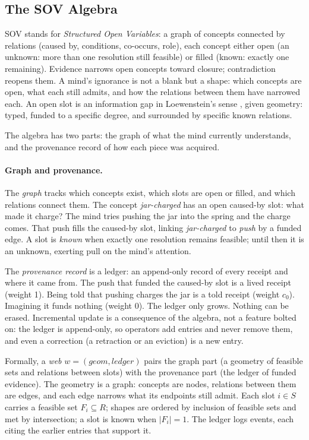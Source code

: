 \documentclass[11pt]{article}
\newcommand{\sov}{\textsc{SOV}}
\theoremstyle{remark}
\begin{document}
\subsection{The \sov{} Algebra}
\label{sec:sov}

\sov{} stands for \emph{Structured Open Variables}: a graph of concepts connected by
relations (caused by, conditions, co-occurs, role), each concept either open
(an unknown: more than one resolution still feasible) or filled (known: exactly one
remaining). Evidence
narrows open concepts toward closure; contradiction reopens them. A mind's ignorance is
not a blank but a shape: which concepts are open, what each still admits, and how the
relations between them have narrowed each. An open slot is an information gap in
Loewenstein's sense \citep{Loewenstein1994}, given geometry: typed, funded to a specific
degree, and surrounded by specific known relations.

The algebra has two parts: the graph of what the mind currently understands, and the
provenance record of how each piece was acquired.

\paragraph{Graph and provenance.} The \emph{graph} tracks which concepts exist, which
slots are open or filled, and which relations connect them. The concept \emph{jar-charged}
has an open caused-by slot: what made it charge? The mind tries pushing the jar into the
spring and the charge comes. That push fills the caused-by slot, linking \emph{jar-charged}
to \emph{push} by a funded edge. A slot is \emph{known} when exactly one resolution remains
feasible; until then it is an unknown, exerting pull on the mind's attention.

The \emph{provenance record} is a ledger: an append-only record of every receipt and where
it came from. The push that funded the caused-by slot is a lived receipt (weight 1). Being
told that pushing charges the jar is a told receipt (weight $c_0$). Imagining it funds
nothing (weight 0). The ledger only grows. Nothing can be erased.
Incremental update is a consequence of the algebra, not a feature bolted on: the ledger is
append-only, so operators add entries and never remove them, and even a correction (a
retraction or an eviction) is a new entry.

Formally, a \emph{web} $w = (\mathit{geom}, \mathit{ledger})$ pairs the graph part (a
geometry of feasible sets and relations between slots) with the provenance part (the ledger
of funded evidence). The geometry is a graph: concepts are nodes, relations between them are edges, and each
edge narrows what its endpoints still admit. Each slot $i \in S$ carries a feasible set $F_i \subseteq R$; shapes
are ordered by inclusion of feasible sets and met by intersection; a slot is known when
$|F_i| = 1$. The ledger logs events, each citing the earlier entries that support it.
\end{document}
